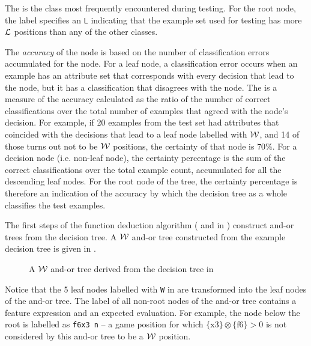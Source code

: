 \documentclass[twoside,11pt]{article}
\begin{document}
The  is the class most frequently encountered during testing. For the root node, the label specifies an {\tt L} indicating that the example set used for testing has more ${\cal L}$ positions than any of the other classes.     

The {\sl accuracy} of the node is based on the number of classification errors accumulated for the node. For a leaf node, a classification error occurs when an example has an attribute set that corresponds with every decision that lead to the node, but it has a classification that disagrees with the node. The  is a measure of the accuracy calculated as the ratio of the number of correct classifications over the total number of examples that agreed with the node's decision. For example, if 20 examples from the test set had attributes that coincided with the decisions that lead to a leaf node labelled with ${\cal W}$, and 14 of those turns out not to be ${\cal W}$ positions, the certainty of that node is $70\%$. For a decision node (i.e. non-leaf node), the certainty percentage is the sum of the correct classifications over the total  example count, accumulated for all the  descending leaf nodes. For the root node of the tree, the certainty percentage is therefore an indication of the accuracy by which the decision tree as a whole classifies the test examples.   

The first steps of the function deduction algorithm ( and  in ) construct and-or trees from the decision tree. A ${\cal W}$ and-or tree constructed from the example decision tree is given in .   
\begin{figure} [ht]
\center
\tiny
{}
{
	{
		{
		{
			{
				{
					{
						{
							{
								{
									{
										{
										}
									}
								}
							{}
							}
						}
					}
				}
			}
		}
	}
}
}
\caption{A ${\cal W}$ and-or tree derived from the decision tree in }
\label{fig:wintree_minimal}
\end{figure}
Notice that the 5 leaf nodes labelled with {\tt W} in  are transformed into the leaf nodes of the and-or tree. The label of all non-root nodes of the and-or tree contains a feature expression and an expected evaluation. For example, the node below the root is labelled as {\tt f6x3 n} -- a game position for which $\{\mbox{x3}\} \otimes \{\mbox{f6}\} > 0$ is not considered by this and-or tree to be a ${\cal W}$ position.  
\end{document}

